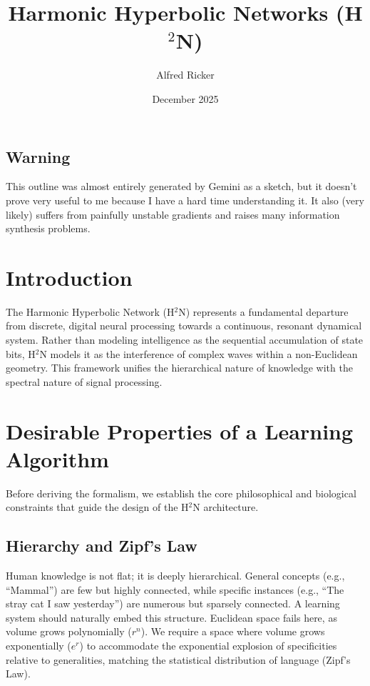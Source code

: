 \documentclass{article}
\title{Harmonic Hyperbolic Networks (H$^2$N)}
\author{Alfred Ricker}
\date{December 2025}
\begin{document}
\maketitle

\subsection{Warning}
This outline was almost entirely generated by Gemini as a sketch, but it doesn't prove very useful to me because I have a hard time understanding it. It also (very likely) suffers from painfully unstable gradients and raises many information synthesis problems.

\section{Introduction}
The Harmonic Hyperbolic Network (H$^2$N) represents a fundamental departure from discrete, digital neural processing towards a continuous, resonant dynamical system. Rather than modeling intelligence as the sequential accumulation of state bits, H$^2$N models it as the interference of complex waves within a non-Euclidean geometry. This framework unifies the hierarchical nature of knowledge with the spectral nature of signal processing.

\section{Desirable Properties of a Learning Algorithm}
Before deriving the formalism, we establish the core philosophical and biological constraints that guide the design of the H$^2$N architecture.

\subsection{Hierarchy and Zipf's Law}
Human knowledge is not flat; it is deeply hierarchical. General concepts (e.g., ``Mammal'') are few but highly connected, while specific instances (e.g., ``The stray cat I saw yesterday'') are numerous but sparsely connected. A learning system should naturally embed this structure. Euclidean space fails here, as volume grows polynomially ($r^n$). We require a space where volume grows exponentially ($e^r$) to accommodate the exponential explosion of specificities relative to generalities, matching the statistical distribution of language (Zipf's Law).
\end{document}
